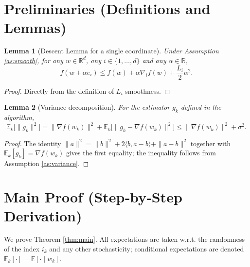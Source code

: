 \documentclass{article}
\newtheorem{lemma}{Lemma}
\begin{document}
\newpage

\section*{Preliminaries (Definitions and Lemmas)}
\begin{lemma}[Descent Lemma for a single coordinate]\label{lem:descent}
Under Assumption \ref{as:smooth}, for any $w\in\mathbb{R}^d$, any $i\in\{1,\dots ,d\}$ and any $\alpha\in\mathbb{R}$,
\[
    f(w+\alpha e_i)\le f(w)+\alpha \nabla_i f(w)+\frac{L_i}{2}\alpha^2 .
\]
\end{lemma}
\begin{proof}
Directly from the definition of $L_i$‑smoothness. \hfill\qedsymbol
\end{proof}

\begin{lemma}[Variance decomposition]\label{lem:variance}
For the estimator $g_k$ defined in the algorithm,
\[
    \mathbb{E}_k\!\bigl[\|g_k\|^2\bigr]
    =\|\nabla f(w_k)\|^2+\mathbb{E}_k\!\bigl[\|g_k-\nabla f(w_k)\|^2\bigr]
    \le \|\nabla f(w_k)\|^2+\sigma^2 .
\]
\end{lemma}
\begin{proof}
The identity $\|a\|^2=\|b\|^2+2\langle b,a-b\rangle+\|a-b\|^2$ together with $\mathbb{E}_k[g_k]=\nabla f(w_k)$ gives the first equality; the inequality follows from Assumption \ref{as:variance}. \hfill\qedsymbol
\end{proof}

\section*{Main Proof (Step‑by‑Step Derivation)}
We prove Theorem \ref{thm:main}. All expectations are taken w.r.t. the randomness of the index $i_k$ and any other stochasticity; conditional expectations are denoted $\mathbb{E}_k[\cdot]=\mathbb{E}[\cdot\mid w_k]$.
\end{document}
